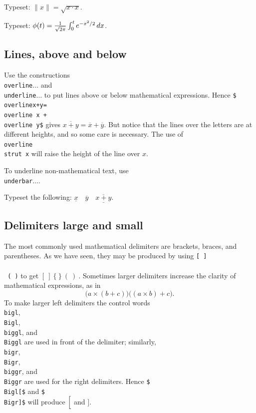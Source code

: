 \exercise Typeset: $\|x\| = \sqrt{x\cdot x}$. 

\exercise Typeset: 
$\phi(t) = {1 \over \sqrt{2\pi}} \int_0^t e^{-x^2/2}\,dx$. 


\subsection{Lines, above and below} 

Use the constructions {\tt \\overline\lb$\ldots$\rb} and 
{\tt \\underline\lb$\ldots$\rb} to put lines above or below mathematical 
expressions. Hence {\tt \$\\overline\lb x+y\rb=\\overline x + \\overline 
y\$} gives $\overline{x+y}=\overline x + \overline y$\null. 
But notice that the lines over the letters are at 
different heights, and so some care is necessary. The use of {\tt 
\\overline\lb\\strut x\rb} will raise the height of the line 
over $x$\null. 

To underline non-mathematical text, use {\tt \\underbar\lb$\dots$\rb}. 

\exercise Typeset the following: $\underline x \quad \overline y 
\quad \underline{\overline{x+y}}$. 


\subsection{Delimiters large and small} 

The most commonly used mathematical delimiters are brackets, 
braces, and parentheses.  As we have seen, they may be produced 
by using {\tt [ ] \\\lb\ \\\rb\ ( )} to get 
$[\>]\>\{\>\}\>(\>)\>$. Sometimes larger delimiters increase the 
clarity of mathematical expressions, as in 
$$\bigl(a\times(b+c)\bigr) \bigl((a\times b)+c\bigr).$$ To make 
larger left delimiters the control words {\tt \\bigl}, {\tt 
\\Bigl}, {\tt \\biggl}, and {\tt \\Biggl} are used in front of 
the delimiter; similarly, {\tt \\bigr}, {\tt \\Bigr}, {\tt 
\\biggr}, and {\tt \\Biggr} are used for the 
right delimiters. Hence {\tt \$\\Bigl[\$} and {\tt \$\\Bigr]\$} 
will produce $\Bigl[$ and $\Bigr]$. 

